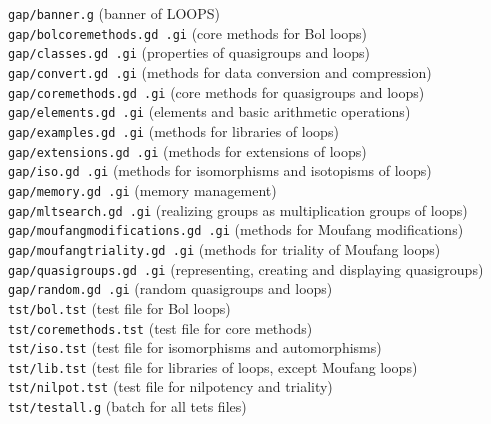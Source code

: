 \documentclass[a4paper,11pt]{report}
\begin{document}
{\texttt{gap/banner.g} (banner of LOOPS) \\
\texttt{gap/bol{\textunderscore}core{\textunderscore}methods.gd .gi} (core methods for Bol loops) \\
\texttt{gap/classes.gd .gi} (properties of quasigroups and loops) \\
\texttt{gap/convert.gd .gi} (methods for data conversion and compression) \\
\texttt{gap/core{\textunderscore}methods.gd .gi} (core methods for quasigroups and loops) \\
\texttt{gap/elements.gd .gi} (elements and basic arithmetic operations) \\
\texttt{gap/examples.gd .gi} (methods for libraries of loops) \\
\texttt{gap/extensions.gd .gi} (methods for extensions of loops) \\
\texttt{gap/iso.gd .gi} (methods for isomorphisms and isotopisms of loops) \\
\texttt{gap/memory.gd .gi} (memory management) \\
\texttt{gap/mlt{\textunderscore}search.gd .gi} (realizing groups as multiplication groups of loops) \\
\texttt{gap/moufang{\textunderscore}modifications.gd .gi} (methods for Moufang modifications) \\
\texttt{gap/moufang{\textunderscore}triality.gd .gi} (methods for triality of Moufang loops) \\
\texttt{gap/quasigroups.gd .gi} (representing, creating and displaying quasigroups) \\
\texttt{gap/random.gd .gi} (random quasigroups and loops) \\
\texttt{tst/bol.tst} (test file for Bol loops) \\
\texttt{tst/core{\textunderscore}methods.tst} (test file for core methods) \\
\texttt{tst/iso.tst} (test file for isomorphisms and automorphisms) \\
\texttt{tst/lib.tst} (test file for libraries of loops, except Moufang loops) \\
\texttt{tst/nilpot.tst} (test file for nilpotency and triality) \\
\texttt{tst/testall.g} (batch for all tets files) }
\end{document}
